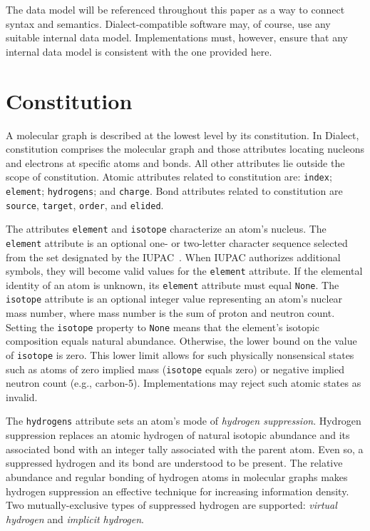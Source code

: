 \documentclass{article}
\def\ttt{\texttt}
\begin{document}
The data model will be referenced throughout this paper as a way to connect syntax and semantics. Dialect-compatible software may, of course, use any suitable internal data model. Implementations must, however, ensure that any internal data model is consistent with the one provided here.

\section*{Constitution}

A molecular graph is described at the lowest level by its constitution. In Dialect, constitution comprises the molecular graph and those attributes locating nucleons and electrons at specific atoms and bonds. All other attributes lie outside the scope of constitution. Atomic attributes related to constitution are: \ttt{index}; \ttt{element}; \ttt{hydrogens}; and \ttt{charge}. Bond attributes related to constitution are \ttt{source}, \ttt{target}, \ttt{order}, and \ttt{elided}.

The attributes \ttt{element} and \ttt{isotope} characterize an atom's nucleus. The \ttt{element} attribute is an optional one- or two-letter character sequence selected from the set designated by the IUPAC~\cite{periodicTable}. When IUPAC authorizes additional symbols, they will become valid values for the \ttt{element} attribute. If the elemental identity of an atom is unknown, its \ttt{element} attribute must equal \ttt{None}. The \ttt{isotope} attribute is an optional integer value representing an atom's nuclear mass number, where mass number is the sum of proton and neutron count. Setting the \ttt{isotope} property to \ttt{None} means that the element's isotopic composition equals natural abundance. Otherwise, the lower bound on the value of \ttt{isotope} is zero. This lower limit allows for such physically nonsensical states such as atoms of zero implied mass (\ttt{isotope} equals zero) or negative implied neutron count (e.g., carbon-5). Implementations may reject such atomic states as invalid.

The \ttt{hydrogens} attribute sets an atom's mode of \textit{hydrogen suppression}. Hydrogen suppression replaces an atomic hydrogen of natural isotopic abundance and its associated bond with an integer tally associated with the parent atom. Even so, a suppressed hydrogen and its bond are understood to be present. The relative abundance and regular bonding of hydrogen atoms in molecular graphs makes hydrogen suppression an effective technique for increasing information density. Two mutually-exclusive types of suppressed hydrogen are supported: \textit{virtual hydrogen} and \textit{implicit hydrogen}.
\end{document}
